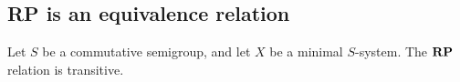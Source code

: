     

    

\subsection{RP is an equivalence relation}

\begin{theorem}
\label{theorem_rp_is_transitive}
\leanok{}
    Let $S$ be a commutative semigroup, and let $X$ be a minimal $S$-system.  The $\mathbf{RP}$ relation is transitive.
\end{theorem}

